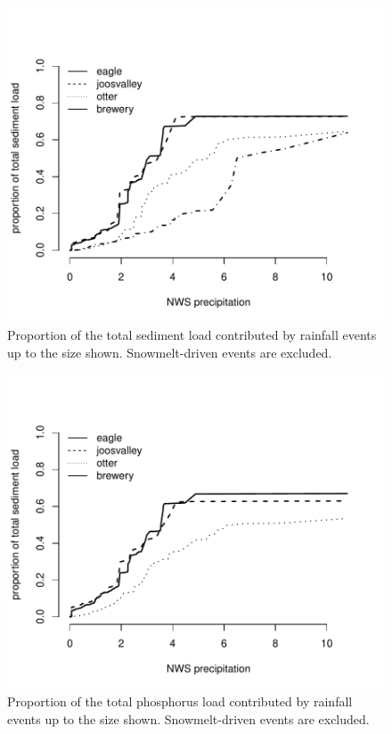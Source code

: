\documentclass[12pt]{article}
\begin{document}
\begin{figure}
    \begin{center}
\includegraphics{loadings-figure2}
    \end{center}
    \caption{Proportion of the total sediment load contributed by rainfall events up to the size shown. Snowmelt-driven events are excluded.\label{cdf-p}}
\end{figure}

\begin{figure}
    \begin{center}
\includegraphics{loadings-figure3}
    \end{center}
    \caption{Proportion of the total phosphorus load contributed by rainfall events up to the size shown. Snowmelt-driven events are excluded.\label{cdf-s}}
\end{figure}
\end{document}
